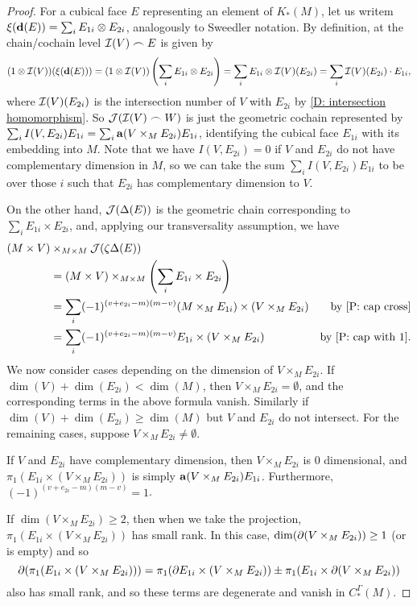 \begin{proof}
For a cubical face $E$ representing an element of $K_*(M)$, let us writem$\xi(\mathbf{d} (E)) = \sum_i E_{1i} \otimes E_{2i}$, analogously to Sweedler notation. By definition, at the chain/cochain level $\mathcal{I}(V)\frown E$ is given by
$$(1 \otimes \mathcal{I}(V))(\xi(\mathbf{d} (E))) = (1 \otimes \mathcal{I}(V))\left(\sum_i E_{1i} \otimes E_{2i}\right) = \sum_i E_{1i} \otimes \mathcal{I}(V)(E_{2i}) = \sum_i \mathcal{I}(V)(E_{2i})\cdot E_{1i},$$
where $\mathcal{I}(V)(E_{2i})$ is the intersection number of $V$ with $E_{2i}$ by \cref{D: intersection homomorphism}. So $\mathcal{J}(\mathcal{I}(V)\frown W)$ is just the geometric cochain represented by $\sum_i I(V,E_{2i})E_{1i} = \sum_i \mathbf{a}(V \times_M E_{2i})E_{1i} $, identifying the cubical face $E_{1i}$ with its embedding into $M$. Note that we have $I(V,E_{2i}) = 0$ if $V$ and $E_{2i}$ do not have complementary dimension in $M$, so we can take the sum $\sum_i I(V,E_{2i})E_{1i}$ to be over those $i$ such that $E_{2i}$ has complementary dimension to $V$.

On the other hand, $\mathcal{J}(\Delta(E))$ is the geometric chain corresponding to $\sum_i E_{1i} \times E_{2i}$, and, applying our transversality assumption, we have
\begin{align*}
(M \times V)&\times_{M \times M}\mc J(\zeta\Delta(E))\\
& = (M \times V)\times_{M \times M}\left(\sum_i E_{1i} \times E_{2i}\right)\\
& = \sum_i (-1)^{(v+e_{2i}-m)(m-v)}(M \times_M E_{1i}) \times (V \times_M E_{2i})&\text{by \cref{P: cap cross}}\\
& = \sum_i (-1)^{(v+e_{2i}-m)(m-v)}E_{1i} \times (V \times_M E_{2i})&\text{by \cref{P: cap with 1}}.
\end{align*}
We now consider cases depending on the dimension of $V \times_M E_{2i}$. If $\dim(V)+\dim(E_{2i})<\dim (M)$, then $V \times_M E_{2i} = \emptyset$, and the corresponding terms in the above formula vanish. Similarly if $\dim(V)+\dim(E_{2i})\geq \dim (M)$ but $V$ and $E_{2i}$ do not intersect. For the remaining cases, suppose
$V \times_M E_{2i}\neq \emptyset$.

If $V$ and $E_{2i}$ have complementary dimension, then $V \times_M E_{2i}$ is $0$ dimensional, and $\pi_1(
E_{1i} \times (V \times_M E_{2i}))$ is simply $\mathbf{a}(V \times_M E_{2i})E_{1i}$. Furthermore, $(-1)^{(v+e_{2i}-m)(m-v)} = 1$.

If $\dim(V \times_M E_{2i})\geq 2$, then when we take the projection,
 $\pi_1(E_{1i} \times (V \times_M E_{2i}))$ has small rank. In this case, $\dim(\partial (V \times_M E_{2i}))\geq 1$ (or is empty) and so
$$\partial(\pi_1(E_{1i} \times (V \times_M E_{2i}))) = \pi_1(\partial E_{1i} \times (V \times_M E_{2i}))\pm \pi_1(E_{1i} \times \partial(V \times_M E_{2i}))$$
also has small rank, and so these terms are degenerate and vanish in $C^\Gamma_*(M)$.


\end{proof}
